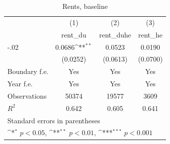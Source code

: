 \begin{table}[htbp]\centering
\def\sym#1{\ifmmode^{#1}\else\(^{#1}\)\fi}
\caption{Rents, baseline}
\begin{tabular}{l*{3}{c}}
\hline\hline
                    &\multicolumn{1}{c}{(1)}&\multicolumn{1}{c}{(2)}&\multicolumn{1}{c}{(3)}\\
                    &\multicolumn{1}{c}{rent\_du}&\multicolumn{1}{c}{rent\_duhe}&\multicolumn{1}{c}{rent\_he}\\
\hline
-.02                &      0.0686\sym{**} &      0.0523         &      0.0190         \\
                    &    (0.0252)         &    (0.0613)         &    (0.0700)         \\
[1em]
Boundary f.e.       &         Yes         &         Yes         &         Yes         \\
[1em]
Year f.e.           &         Yes         &         Yes         &         Yes         \\
\hline
Observations        &       50374         &       19577         &        3609         \\
\(R^{2}\)           &       0.642         &       0.605         &       0.641         \\
\hline\hline
\multicolumn{4}{l}{\footnotesize Standard errors in parentheses}\\
\multicolumn{4}{l}{\footnotesize \sym{*} \(p<0.05\), \sym{**} \(p<0.01\), \sym{***} \(p<0.001\)}\\
\end{tabular}
\end{table}
